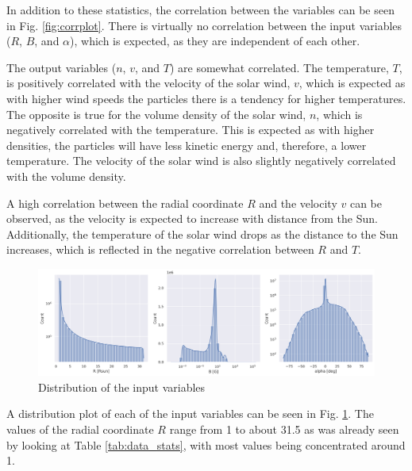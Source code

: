 In addition to these statistics, the correlation between the variables can be seen in Fig. \ref{fig:corrplot}. There is virtually no correlation between the input variables ($R$, $B$, and $\alpha$), which is expected, as they are independent of each other. 

The output variables ($n$, $v$, and $T$) are somewhat correlated. The temperature, $T$, is positively correlated with the velocity of the solar wind, $v$, which is expected as with higher wind speeds the particles there is a tendency for higher temperatures. The opposite is true for the volume density of the solar wind, $n$, which is negatively correlated with the temperature. This is expected as with higher densities, the particles will have less kinetic energy and, therefore, a lower temperature. The velocity of the solar wind is also slightly negatively correlated with the volume density.

A high correlation between the radial coordinate $R$ and the velocity $v$ can be observed, as the velocity is expected to increase with distance from the Sun. Additionally, the temperature of the solar wind drops as the distance to the Sun increases, which is reflected in the negative correlation between $R$ and $T$.

\begin{figure}
    \centering
    \includegraphics[width=\textwidth]{figures/input_vars_distribution.png}
    \caption{Distribution of the input variables}
    \label{fig:input_vars_distr}
\end{figure}

A distribution plot of each of the input variables can be seen in Fig. \ref{fig:input_vars_distr}. The values of the radial coordinate $R$ range from 1 to about 31.5 as was already seen by looking at Table \ref{tab:data_stats}, with most values being concentrated around 1. %


